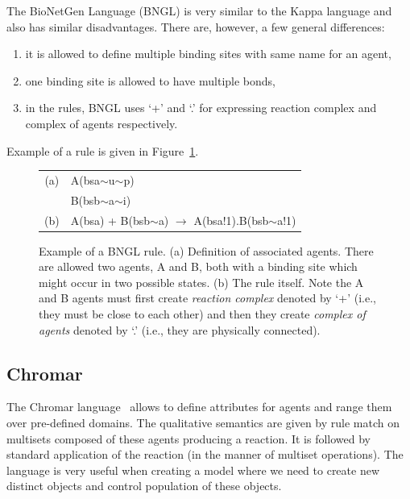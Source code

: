 \documentclass[12pt, twoside]{fithesis2} %
\begin{document}
The BioNetGen Language (BNGL) \cite{BNGL} is very similar to the Kappa language and also has similar disadvantages. There are, however, a few general differences: 

\begin{enumerate}
	\item it is allowed to define multiple binding sites with same name for an agent,
	\item one binding site is allowed to have multiple bonds,
	\item in the rules, BNGL uses `+' and `.' for expressing reaction complex and complex of agents respectively.
\end{enumerate}

Example of a rule is given in Figure~\ref{bngl-rule}.

\begin{figure}[!h]
\begin{center}
\begin{tabular}{c l}
(a) & A(bsa$\sim$u$\sim$p) \\
  & B(bsb$\sim$a$\sim$i) \\
(b) & A(bsa) + B(bsb$\sim$a) $\rightarrow$ A(bsa!1).B(bsb$\sim$a!1) \\
\end{tabular}
\end{center}
\caption{Example of a BNGL rule. (a) Definition of associated agents. There are allowed two agents, A and B, both with a binding site which might occur in two possible states. (b) The rule itself. Note the A and B agents must first create \emph{reaction complex} denoted by `+' (i.e., they must be close to each other) and then they create \emph{complex of agents} denoted by `.' (i.e., they are physically connected).}\label{bngl-rule}
\end{figure}

\subsection{Chromar}

The Chromar language~\cite{honorato2017chromar} allows to define attributes for agents and range them over pre-defined domains. The qualitative semantics are given by rule match on multisets composed of these agents producing a reaction. It is followed by standard application of the reaction (in the manner of multiset operations). The language is very useful when creating a model where we need to create new distinct objects and control population of these objects.
\end{document}
